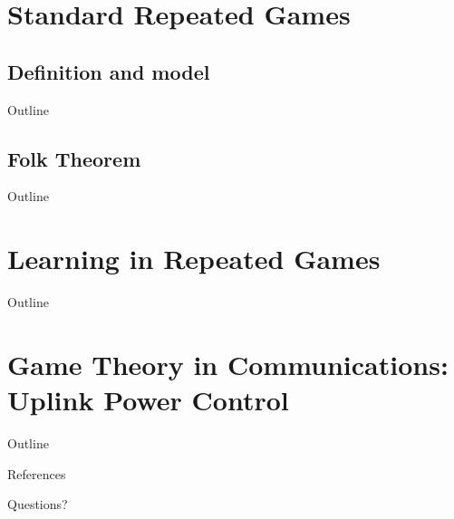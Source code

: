 \documentclass[10pt]{beamer}
\begin{document}


\section{Standard Repeated Games}
\subsection{Definition and model}
\begin{frame}{Outline}
    \tableofcontents[currentsection]
\end{frame}



\subsection{Folk Theorem}
\begin{frame}{Outline}
    \tableofcontents[currentsection]
\end{frame}



\section{Learning in Repeated Games}
\begin{frame}{Outline}
    \tableofcontents[currentsection]
\end{frame}



\section{Game Theory in Communications: Uplink Power Control}
\begin{frame}{Outline}
    \tableofcontents[currentsection]
\end{frame}



\begin{frame}{References}
    \nocite{*}
    
    
\end{frame}

\begin{frame}[standout]
    Questions?
\end{frame}
\end{document}
